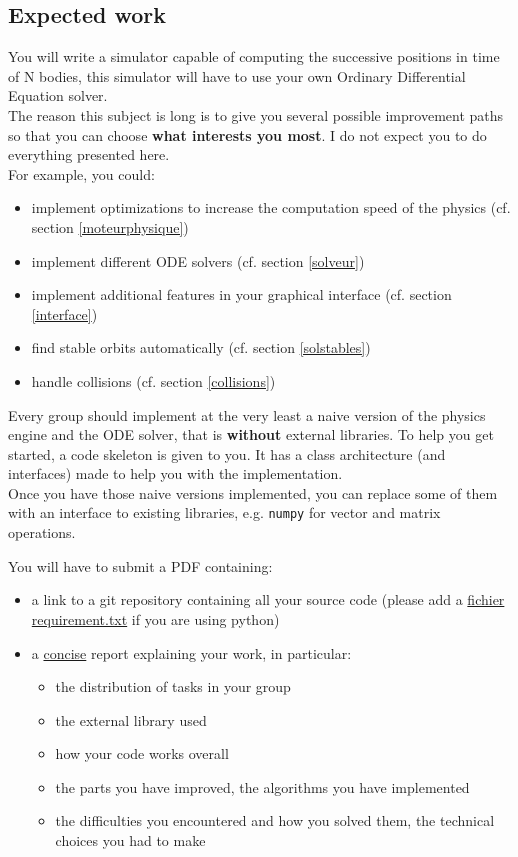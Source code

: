 \documentclass{article}
\begin{document}
\subsection{Expected work}

You will write a simulator capable of computing the successive positions in time of N bodies, this simulator will have to use your own Ordinary Differential Equation solver. \\
The reason this subject is long is to give you several possible improvement paths so that you can choose \textbf{what interests you most}. I do not expect you to do everything presented here.\\
For example, you could:
\begin{itemize}
    \item implement optimizations to increase the computation speed of the physics (cf. section \ref{moteurphysique})
    \item implement different ODE solvers (cf. section \ref{solveur})
    \item implement additional features in your graphical interface (cf. section \ref{interface})
    \item find stable orbits automatically (cf. section \ref{solstables})
    \item handle collisions (cf. section \ref{collisions})
\end{itemize}
Every group should implement at the very least a naive version of the physics engine and the ODE solver, that is \textbf{without} external libraries.
To help you get started, a code skeleton is given to you. It has a class architecture (and interfaces) made to help you with the implementation.\\
Once you have those naive versions implemented, you can replace some of them with an interface to existing libraries, e.g. \verb!numpy! for vector and matrix operations.\\

\vspace{1em}

\noindent You will have to submit a PDF containing:
\begin{itemize}
    \item a link to a git repository containing all your source code (please add a \href{https://pip.pypa.io/en/stable/user_guide/#requirements-files}{fichier requirement.txt} if you are using python)
    \item a \underline{concise} report explaining your work, in particular:
    \begin{itemize}
        \item the distribution of tasks in your group
        \item the external library used
        \item how your code works overall
        \item the parts you have improved, the algorithms you have implemented
        \item the difficulties you encountered and how you solved them, the technical choices you had to make
    \end{itemize}
\end{itemize}
\end{document}
